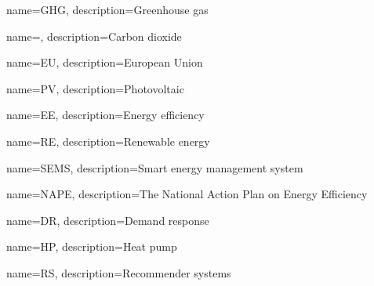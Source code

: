 \makeglossaries

{
    name=GHG,
    description={Greenhouse gas}
}

{
    name=,
    description={Carbon dioxide}
}

{
    name=EU,
    description={European Union}
}

{
    name=PV,
    description={Photovoltaic}
}

{
    name=EE,
    description={Energy efficiency}
}

{
    name=RE,
    description={Renewable energy}
}

{
    name=SEMS,
    description={Smart energy management system}
}

{
    name=NAPE,
    description={The National Action Plan on Energy Efficiency}
}

{
    name=DR,
    description={Demand response}
}

{
    name=HP,
    description={Heat pump}
}

{
    name=RS,
    description={Recommender systems}
}